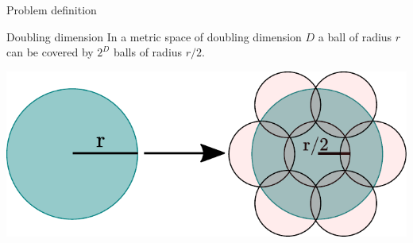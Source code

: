 \documentclass{beamer}
\begin{document}
\begin{frame}{Problem definition}
	\begin{block}{Doubling dimension}
		In a metric space of doubling dimension $D$ a ball of radius $r$
		can be covered by $2^D$ balls of radius $r/2$.
	\end{block}
	\centering
	\includegraphics[width=\textwidth]{figs/doubling-dimension.pdf}
\end{frame}
\end{document}
